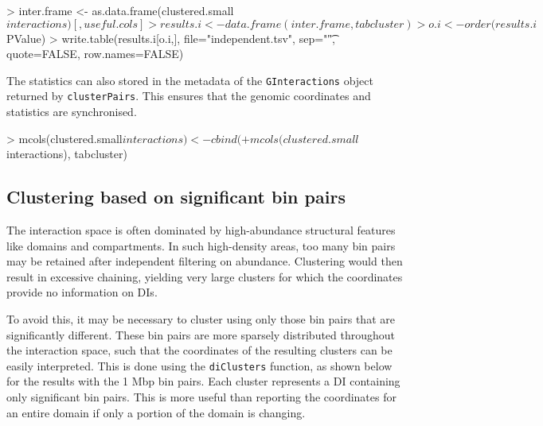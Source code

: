 \documentclass[12pt]{report}
\renewenvironment{Schunk}{\vspace{0pt}}{\vspace{0pt}}
\newcommand{\code}[1]{{\small\texttt{#1}}}
\begin{document}
\begin{Schunk}
\begin{Sinput}
> inter.frame <- as.data.frame(clustered.small$interactions)[,useful.cols]
> results.i <- data.frame(inter.frame, tabcluster)
> o.i <- order(results.i$PValue)
> write.table(results.i[o.i,], file="independent.tsv", sep="\t", quote=FALSE, row.names=FALSE)
\end{Sinput}
\end{Schunk}

The statistics can also stored in the metadata of the \code{GInteractions} object returned by \code{clusterPairs}. 
This ensures that the genomic coordinates and statistics are synchronised.

\begin{Schunk}
\begin{Sinput}
> mcols(clustered.small$interactions) <- cbind(
+     mcols(clustered.small$interactions), tabcluster)
\end{Sinput}
\end{Schunk}

\subsection{Clustering based on significant bin pairs}
\label{sec:sigclust}
The interaction space is often dominated by high-abundance structural features like domains and compartments. 
In such high-density areas, too many bin pairs may be retained after independent filtering on abundance.
Clustering would then result in excessive chaining, yielding very large clusters for which the coordinates provide no information on DIs.

To avoid this, it may be necessary to cluster using only those bin pairs that are significantly different.
These bin pairs are more sparsely distributed throughout the interaction space, such that the coordinates of the resulting clusters can be easily interpreted.
This is done using the \code{diClusters} function, as shown below for the results with the 1 Mbp bin pairs.
Each cluster represents a DI containing only significant bin pairs.
This is more useful than reporting the coordinates for an entire domain if only a portion of the domain is changing.
\end{document}
